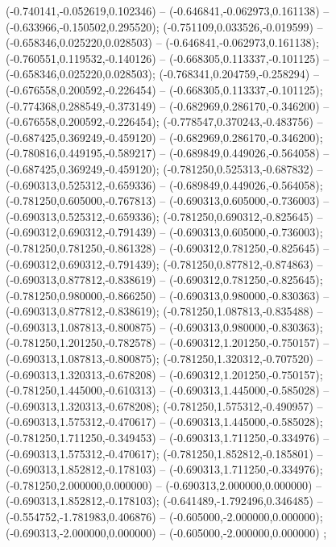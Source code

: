  (-0.740141,-0.052619,0.102346) -- (-0.646841,-0.062973,0.161138) -- (-0.633966,-0.150502,0.295520);
 (-0.751109,0.033526,-0.019599) -- (-0.658346,0.025220,0.028503) -- (-0.646841,-0.062973,0.161138);
 (-0.760551,0.119532,-0.140126) -- (-0.668305,0.113337,-0.101125) -- (-0.658346,0.025220,0.028503);
 (-0.768341,0.204759,-0.258294) -- (-0.676558,0.200592,-0.226454) -- (-0.668305,0.113337,-0.101125);
 (-0.774368,0.288549,-0.373149) -- (-0.682969,0.286170,-0.346200) -- (-0.676558,0.200592,-0.226454);
 (-0.778547,0.370243,-0.483756) -- (-0.687425,0.369249,-0.459120) -- (-0.682969,0.286170,-0.346200);
 (-0.780816,0.449195,-0.589217) -- (-0.689849,0.449026,-0.564058) -- (-0.687425,0.369249,-0.459120);
 (-0.781250,0.525313,-0.687832) -- (-0.690313,0.525312,-0.659336) -- (-0.689849,0.449026,-0.564058);
 (-0.781250,0.605000,-0.767813) -- (-0.690313,0.605000,-0.736003) -- (-0.690313,0.525312,-0.659336);
 (-0.781250,0.690312,-0.825645) -- (-0.690312,0.690312,-0.791439) -- (-0.690313,0.605000,-0.736003);
 (-0.781250,0.781250,-0.861328) -- (-0.690312,0.781250,-0.825645) -- (-0.690312,0.690312,-0.791439);
 (-0.781250,0.877812,-0.874863) -- (-0.690313,0.877812,-0.838619) -- (-0.690312,0.781250,-0.825645);
 (-0.781250,0.980000,-0.866250) -- (-0.690313,0.980000,-0.830363) -- (-0.690313,0.877812,-0.838619);
 (-0.781250,1.087813,-0.835488) -- (-0.690313,1.087813,-0.800875) -- (-0.690313,0.980000,-0.830363);
 (-0.781250,1.201250,-0.782578) -- (-0.690312,1.201250,-0.750157) -- (-0.690313,1.087813,-0.800875);
 (-0.781250,1.320312,-0.707520) -- (-0.690313,1.320313,-0.678208) -- (-0.690312,1.201250,-0.750157);
 (-0.781250,1.445000,-0.610313) -- (-0.690313,1.445000,-0.585028) -- (-0.690313,1.320313,-0.678208);
 (-0.781250,1.575312,-0.490957) -- (-0.690313,1.575312,-0.470617) -- (-0.690313,1.445000,-0.585028);
 (-0.781250,1.711250,-0.349453) -- (-0.690313,1.711250,-0.334976) -- (-0.690313,1.575312,-0.470617);
 (-0.781250,1.852812,-0.185801) -- (-0.690313,1.852812,-0.178103) -- (-0.690313,1.711250,-0.334976);
 (-0.781250,2.000000,0.000000) -- (-0.690313,2.000000,0.000000) -- (-0.690313,1.852812,-0.178103);
 (-0.641489,-1.792496,0.346485) -- (-0.554752,-1.781983,0.406876) -- (-0.605000,-2.000000,0.000000);
 (-0.690313,-2.000000,0.000000) -- (-0.605000,-2.000000,0.000000) ;
